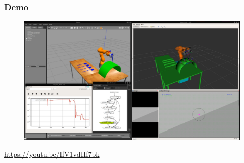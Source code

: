 \begin{frame}
\frametitle{Demo}
\begin{center}
\begin{figure}[!htb]
\centering
\includegraphics[width=\textwidth]{../images/demo.png}\\
\end{figure}
\url{https://youtu.be/lfV1vdHf7bk}
\end{center}
\end{frame}